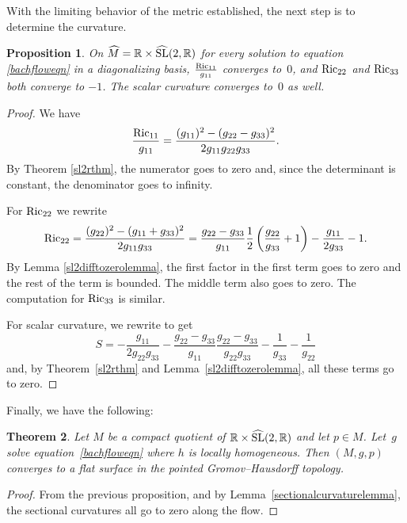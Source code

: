 \documentclass[pdftex]{sigma}
\numberwithin{equation}{section}
\newtheorem{Theorem}{Theorem}[section]
\newtheorem{Proposition}[Theorem]{Proposition}
 { \theoremstyle{definition}
\newtheorem{Definition}[Theorem]{Definition}
\newtheorem{Example}[Theorem]{Example}
\newtheorem{Remark}[Theorem]{Remark} }
\begin{document}
With the limiting behavior of the metric established, the next step is to determine the curvature.

\begin{Proposition}
On $\widehat{M} = \mathbb{R} \times \widehat{{\rm SL}}(2, \mathbb{R})$ for every solution to equation \eqref{bachfloweqn} in a diagonalizing basis, $\frac{{\rm Ric}_{11}}{g_{11}}$ converges to~$0$, and ${\rm Ric}_{22}$ and ${\rm Ric}_{33}$ both converge to $-1$. The scalar curvature converges to~$0$ as well.
\end{Proposition}

\begin{proof}We have
\[
\frac{{\rm Ric}_{11}}{g_{11}} = \frac{(g_{11})^2 - (g_{22} - g_{33})^2}{2 g_{11} g_{22} g_{33}}.
\]
By Theorem \ref{sl2rthm}, the numerator goes to zero and, since the determinant is constant, the denominator goes to infinity.

For ${\rm Ric}_{22}$ we rewrite
\begin{gather*}
{\rm Ric}_{22} = \frac{(g_{22})^2 - (g_{11} + g_{33})^2}{2 g_{11} g_{33}}
		= \frac{g_{22} - g_{33}}{g_{11}} \frac{1}{2}\left(\frac{g_{22}}{g_{33}} + 1 \right)
			- \frac{g_{11}}{2 g_{33}}
			- 1.
\end{gather*}
By Lemma \ref{sl2difftozerolemma}, the first factor in the first term goes to zero and the rest of the term is bounded. The middle term also goes to zero. The computation for ${\rm Ric}_{33}$ is similar.

For scalar curvature, we rewrite to get
\[
S = -\frac{g_{11}}{2 g_{22} g_{33}} - \frac{g_{22}
		- g_{33}}{g_{11}} \frac{g_{22} - g_{33}}{g_{22} g_{33}}
		- \frac{1}{g_{33}} - \frac{1}{g_{22}}
\]
and, by Theorem~\ref{sl2rthm} and Lemma~\ref{sl2difftozerolemma}, all these terms go to zero.
\end{proof}

Finally, we have the following:

\begin{Theorem}Let $M$ be a compact quotient of $\mathbb{R} \times \widehat{{\rm SL}}(2, \mathbb{R})$ and let $p \in M$. Let~$g$ solve equation~\eqref{bachfloweqn} where $h$ is locally homogeneous. Then $(M, g, p)$ converges to a flat surface in the pointed Gromov--Hausdorff topology.
\end{Theorem}

\begin{proof}From the previous proposition, and by Lemma~\ref{sectionalcurvaturelemma}, the sectional curvatures all go to zero along the flow.
 \end{proof}
\end{document}
